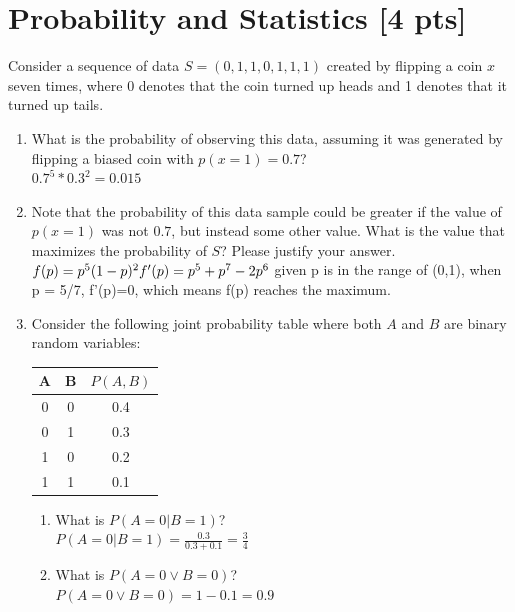 \documentclass[a4paper]{article}
\theoremstyle{definition}
\newenvironment{soln}{
    \leavevmode\color{blue}\ignorespaces
}{}
\begin{document}
\section{Probability and Statistics [4 pts]}
Consider a sequence of data $S = (0, 1, 1, 0, 1, 1, 1)$ created by flipping a coin $x$ seven times, where 0 denotes that the coin turned up heads and 1 denotes that it turned up tails.
\begin{enumerate}
	\item 	What is the probability of observing this data, assuming it was generated by flipping a biased coin with $p(x=1) = 0.7$?
	    \begin{soln} \\$0.7^5*0.3^2 = 0.015$ \end{soln}
	\item 	Note that the probability of this data sample could be greater if the value of $p(x = 1)$ was not $0.7$, but instead some other value. What is the value that maximizes the probability of $S$? Please justify your answer.\\
	    \begin{soln} $ f(p)=p^5(1-p)^2 \\ f'(p) = p^5+p^7-2p^6\\$ given p is in the range of (0,1), when p = 5/7, f'(p)=0, which means f(p) reaches the maximum. \end{soln}
	\item 	Consider the following joint probability table where both $A$ and $B$ are binary random variables: 
\begin{table}[htb]
\centering
	\begin{tabular}{ccc}\hline
	A & B & $P(A, B)$  \\\hline
	0 & 0 & 0.4 \\
	0 & 1 & 0.3 \\
	1 & 0 & 0.2 \\
	1 & 1 & 0.1 \\\hline
	\end{tabular}
\end{table}
\begin{enumerate}
	\item 	What is $P(A = 0 | B = 1)$?\\
	    \begin{soln}   $P(A = 0 | B = 1) = \frac{0.3}{0.3+0.1} = \frac{3}{4}$\end{soln}
	\item 	What is $P(A = 0 \vee B = 0 )$?\\
	    \begin{soln}  $P(A = 0 \vee B = 0 ) = 1-0.1=0.9$ \end{soln}
\end{enumerate}
\end{enumerate}
\end{document}
